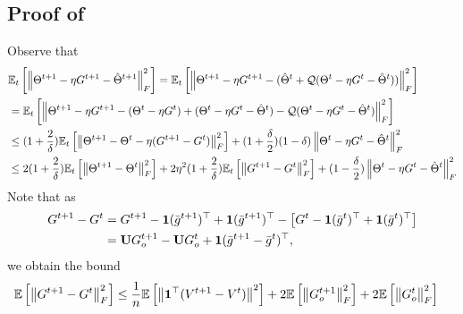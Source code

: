 \documentclass[10pt]{article} %
\theoremstyle{plain}
\theoremstyle{definition}
\theoremstyle{remark}
\newcommand{\avgg}{\bar{g}}
\newcommand{\norm}[1]{\left\| #1 \right\|}
\newcommand{\nl}{\nonumber\\}
\newcommand{\U}{{\bf U}}
\newcommand{\avggrdF}{\overline{\nabla F}}
\newcommand{\avgv}{\bar{v}}
\begin{document}
\subsection{Proof of } \label{app:thetahat_new}
Observe that 
\begin{align}
    & \mathbb{E}_t \left[ \norm{\Theta^{t+1}- \eta G^{t+1}- \hat{\Theta}^{t+1}}_F^2 \right] = \mathbb{E}_t \left[ \norm{\Theta^{t+1}- \eta G^{t+1}- (\hat{\Theta}^t + {\cal Q}(\Theta^t - \eta G^t - \hat{\Theta}^t ))}_F^2 \right] 
    \nl &= \mathbb{E}_t \left[ \norm{\Theta^{t+1}- \eta G^{t+1}- (\Theta^t - \eta G^t) + (\Theta^t - \eta G^t - \hat{\Theta}^t) - {\cal Q}(\Theta^t - \eta G^t - \hat{\Theta}^t )}_F^2 \right]
    \nl & \leq (1+\frac{2}{\delta}) \mathbb{E}_t \left[ \norm{\Theta^{t+1}- \Theta^t - \eta(G^{t+1}- G^t)}_F^2 \right] + (1+\frac{\delta}{2})(1-\delta)\norm{\Theta^t - \eta G^t - \hat{\Theta}^t}_F^2
    \nl &\leq 2(1+\frac{2}{\delta}) \mathbb{E}_t \left[ \norm{\Theta^{t+1}- \Theta^t}_F^2 \right] + 2\eta^2 (1+\frac{2}{\delta}) \mathbb{E}_t \left[ \norm{G^{t+1}- G^t}_F^2 \right]
     + (1-\frac{\delta}{2})\norm{\Theta^t - \eta G^t - \hat{\Theta}^t}_F^2 
     \label{int:theta_comm_a}
\end{align}
Note that as 
\begin{align*}
G^{t+1} - G^t & = G^{t+1} - {\bf 1} (\avgg^{t+1})^\top + {\bf 1} (\avgg^{t+1})^\top - \big[ G^{t} - {\bf 1} (\avgg^{t})^\top + {\bf 1} (\avgg^{t})^\top \big] \\
& = \U G_o^{t+1} - \U G_o^t + {\bf 1} ( \avgg^{t+1} - \avgg^t )^\top,
\end{align*}
we obtain the bound 
\begin{align}
    \mathbb{E} \left[ \norm{G^{t+1} - G^t}_F^2 \right] & \leq \frac{1}{n} \mathbb{E} \left[ \norm{ {\bf 1}^\top ( V^{t+1} - V^t )}^2 \right] + 2 \mathbb{E} \left[ \norm{ G_o^{t+1} }_F^2 \right] + 2 \mathbb{E} \left[ \norm{ G_o^{t} }_F^2 \right] \nonumber
\end{align}
\end{document}
